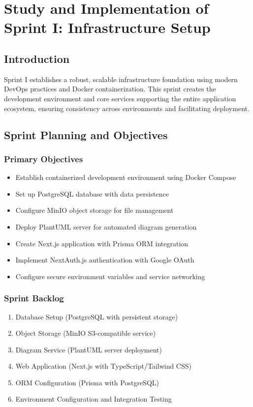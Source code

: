 \chapter[Sprint I]{Study and Implementation of Sprint I: Infrastructure Setup}

\section{Introduction}

Sprint I establishes a robust, scalable infrastructure foundation using modern DevOps practices and Docker containerization. This sprint creates the development environment and core services supporting the entire application ecosystem, ensuring consistency across environments and facilitating deployment.

\section{Sprint Planning and Objectives}

\subsection{Primary Objectives}
\begin{itemize}
    \item Establish containerized development environment using Docker Compose
    \item Set up PostgreSQL database with data persistence
    \item Configure MinIO object storage for file management
    \item Deploy PlantUML server for automated diagram generation
    \item Create Next.js application with Prisma ORM integration
    \item Implement NextAuth.js authentication with Google OAuth
    \item Configure secure environment variables and service networking
\end{itemize}

\subsection{Sprint Backlog}
\begin{enumerate}
    \item Database Setup (PostgreSQL with persistent storage)
    \item Object Storage (MinIO S3-compatible service)
    \item Diagram Service (PlantUML server deployment)
    \item Web Application (Next.js with TypeScript/Tailwind CSS)
    \item ORM Configuration (Prisma with PostgreSQL)

    \item Environment Configuration and Integration Testing
\end{enumerate}

